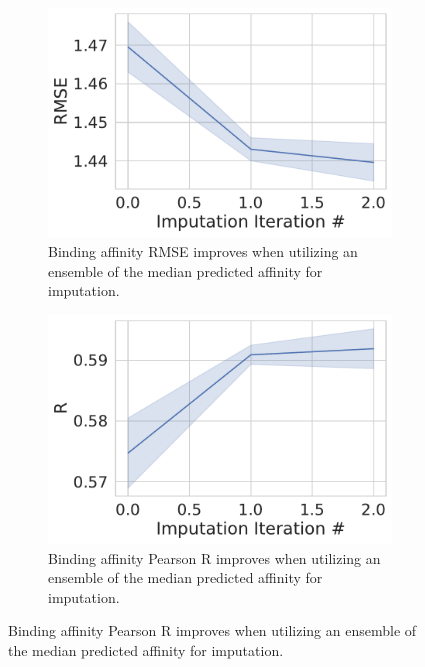 \documentclass[journal=jmcmar,manuscript=article]{achemso}
\begin{document}
\begin{figure}[tbph]
    \centering
    \begin{subfigure}[t]{0.48\textwidth}
        \centering
        \includegraphics[width=\linewidth]{figures/MedGOEnsRMSE.pdf}
        \caption{Binding affinity RMSE improves when utilizing an ensemble of the median predicted affinity for imputation.}
    \end{subfigure}
    \hfill
    \begin{subfigure}[t]{0.48\textwidth}
        \centering
        \includegraphics[width=\linewidth]{figures/MedGOEnsR.pdf}
        \caption{Binding affinity Pearson R improves when utilizing an ensemble of the median predicted affinity for imputation.}
    \end{subfigure}


\end{figure}
\end{document}
